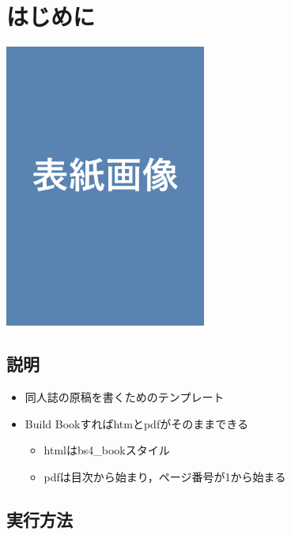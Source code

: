 \documentclass[
  xelatex,ja=standard, b5paper]{bxjsbook}
\author{}
\date{\vspace{-2.5em}}
\providecommand{\tightlist}{%
  \setlength{\itemsep}{0pt}\setlength{\parskip}{0pt}}
\begin{document}
{
\setcounter{tocdepth}{1}
\tableofcontents
}
\hypertarget{hajimeni}{%
\chapter*{はじめに}\label{hajimeni}}

\includegraphics[width=2.60417in,height=\textheight]{images/cover.png}

\hypertarget{ux8aacux660e}{%
\section*{説明}\label{ux8aacux660e}}

\begin{itemize}
\tightlist
\item
  同人誌の原稿を書くためのテンプレート
\item
  Build Bookすればhtmとpdfがそのままできる

  \begin{itemize}
  \tightlist
  \item
    htmlはbs4\_bookスタイル
  \item
    pdfは目次から始まり，ページ番号が1から始まる
  \end{itemize}
\end{itemize}

\hypertarget{ux5b9fux884cux65b9ux6cd5}{%
\section*{実行方法}\label{ux5b9fux884cux65b9ux6cd5}}
\end{document}
